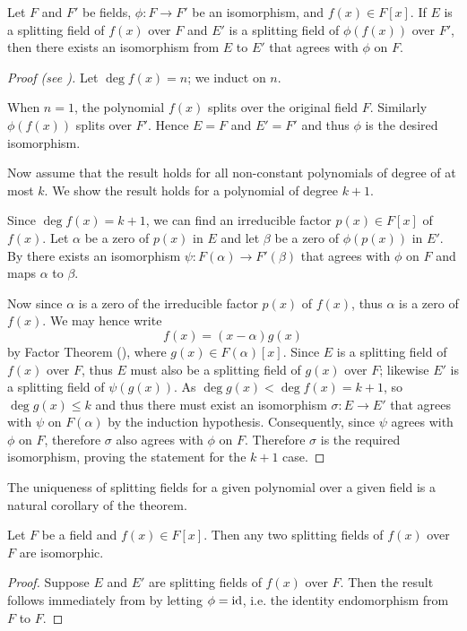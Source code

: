 \begin{theorem}\label{thrm-isomorphism-extension}
    Let $F$ and $F'$ be fields, $\phi: F \to F'$ be an isomorphism, and $f(x) \in F[x]$. If $E$ is a splitting field of $f(x)$ over $F$ and $E'$ is a splitting field of $\phi(f(x))$ over $F'$, then there exists an isomorphism from $E$ to $E'$ that agrees with $\phi$ on $F$.
\end{theorem}
\begin{proof}[Proof (see {\cite[Theorem 20.4]{gallian_2016}})]
    Let $\deg f(x) = n$; we induct on $n$.

    When $n = 1$, the polynomial $f(x)$ splits over the original field $F$. Similarly $\phi(f(x))$ splits over $F'$. Hence $E = F$ and $E' = F'$ and thus $\phi$ is the desired isomorphism.

    Now assume that the result holds for all non-constant polynomials of degree of at most $k$. We show the result holds for a polynomial of degree $k + 1$.

    Since $\deg f(x) = k+1$, we can find an irreducible factor $p(x) \in F[x]$ of $f(x)$. Let $\alpha$ be a zero of $p(x)$ in $E$ and let $\beta$ be a zero of $\phi(p(x))$ in $E'$. By  there exists an isomorphism $\psi: F(\alpha) \to F'(\beta)$ that agrees with $\phi$ on $F$ and maps $\alpha$ to $\beta$.

    Now since $\alpha$ is a zero of the irreducible factor $p(x)$ of $f(x)$, thus $\alpha$ is a zero of $f(x)$. We may hence write
    \[
        f(x) = (x-\alpha)g(x)
    \]
    by Factor Theorem (), where $g(x) \in F(\alpha)[x]$. Since $E$ is a splitting field of $f(x)$ over $F$, thus $E$ must also be a splitting field of $g(x)$ over $F$; likewise $E'$ is a splitting field of $\psi(g(x))$. As $\deg g(x) < \deg f(x) = k+1$, so $\deg g(x) \leq k$ and thus there must exist an isomorphism $\sigma: E \to E'$ that agrees with $\psi$ on $F(\alpha)$ by the induction hypothesis. Consequently, since $\psi$ agrees with $\phi$ on $F$, therefore $\sigma$ also agrees with $\phi$ on $F$. Therefore $\sigma$ is the required isomorphism, proving the statement for the $k+1$ case.
\end{proof}

The uniqueness of splitting fields for a given polynomial over a given field is a natural corollary of the theorem.

\begin{corollary}\label{corollary-splitting-field-unique-up-to-isomorphism}
    Let $F$ be a field and $f(x) \in F[x]$. Then any two splitting fields of $f(x)$ over $F$ are isomorphic.
\end{corollary}
\begin{proof}
    Suppose $E$ and $E'$ are splitting fields of $f(x)$ over $F$. Then the result follows immediately from  by letting $\phi = \mathrm{id}$, i.e. the identity endomorphism from $F$ to $F$.
\end{proof}

